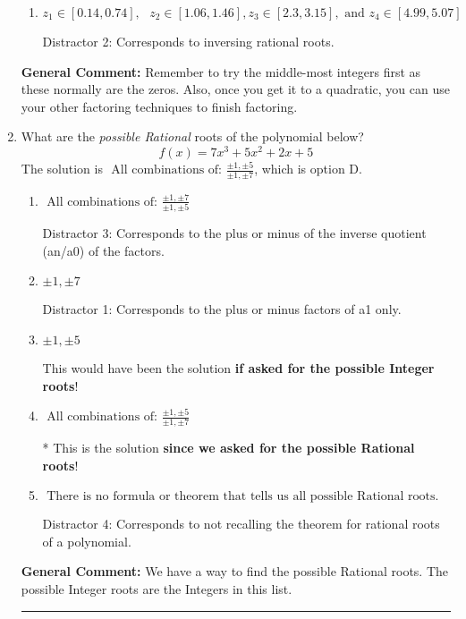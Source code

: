 \documentclass{extbook}[14pt]
\newcommand{\litem}[1]{\item #1

\rule{\textwidth}{0.4pt}}
\begin{document}
\begin{enumerate}
{\begin{enumerate}[label=\Alph*.]
* This is the solution!
\item \( z_1 \in [0.14, 0.74], \text{   }  z_2 \in [1.06, 1.46], z_3 \in [2.3, 3.15], \text{   and   } z_4 \in [4.99, 5.07] \)

 Distractor 2: Corresponds to inversing rational roots.
\end{enumerate}

\textbf{General Comment:} Remember to try the middle-most integers first as these normally are the zeros. Also, once you get it to a quadratic, you can use your other factoring techniques to finish factoring.
}
\litem{
What are the \textit{possible Rational} roots of the polynomial below?
\[ f(x) = 7x^{3} +5 x^{2} +2 x + 5 \]The solution is \( \text{ All combinations of: }\frac{\pm 1,\pm 5}{\pm 1,\pm 7} \), which is option D.\begin{enumerate}[label=\Alph*.]
\item \( \text{ All combinations of: }\frac{\pm 1,\pm 7}{\pm 1,\pm 5} \)

 Distractor 3: Corresponds to the plus or minus of the inverse quotient (an/a0) of the factors. 
\item \( \pm 1,\pm 7 \)

 Distractor 1: Corresponds to the plus or minus factors of a1 only.
\item \( \pm 1,\pm 5 \)

This would have been the solution \textbf{if asked for the possible Integer roots}!
\item \( \text{ All combinations of: }\frac{\pm 1,\pm 5}{\pm 1,\pm 7} \)

* This is the solution \textbf{since we asked for the possible Rational roots}!
\item \( \text{ There is no formula or theorem that tells us all possible Rational roots.} \)

 Distractor 4: Corresponds to not recalling the theorem for rational roots of a polynomial.
\end{enumerate}

\textbf{General Comment:} We have a way to find the possible Rational roots. The possible Integer roots are the Integers in this list.
}
\end{enumerate}
\end{document}
